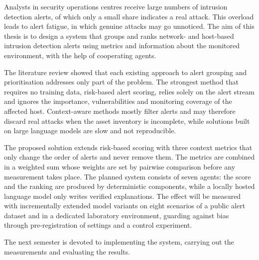 Analysts in security operations centres receive large numbers of intrusion detection alerts, of which only a small share indicates a real attack. This overload leads to alert fatigue, in which genuine attacks may go unnoticed. The aim of this thesis is to design a system that groups and ranks network- and host-based intrusion detection alerts using metrics and information about the monitored environment, with the help of cooperating agents.

The literature review showed that each existing approach to alert grouping and prioritisation addresses only part of the problem. The strongest method that requires no training data, risk-based alert scoring, relies solely on the alert stream and ignores the importance, vulnerabilities and monitoring coverage of the affected host. Context-aware methods mostly filter alerts and may therefore discard real attacks when the asset inventory is incomplete, while solutions built on large language models are slow and not reproducible.

The proposed solution extends risk-based scoring with three context metrics that only change the order of alerts and never remove them. The metrics are combined in a weighted sum whose weights are set by pairwise comparison before any measurement takes place. The planned system consists of seven agents: the score and the ranking are produced by deterministic components, while a locally hosted language model only writes verified explanations. The effect will be measured with incrementally extended model variants on eight scenarios of a public alert dataset and in a dedicated laboratory environment, guarding against bias through pre-registration of settings and a control experiment.

The next semester is devoted to implementing the system, carrying out the measurements and evaluating the results.
